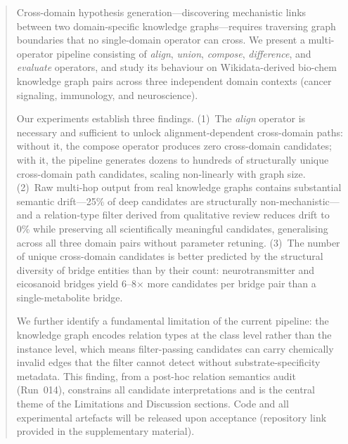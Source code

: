 \begin{abstract}
Cross-domain hypothesis generation---discovering mechanistic links between two
domain-specific knowledge graphs---requires traversing graph boundaries that no
single-domain operator can cross.
We present a multi-operator pipeline consisting of \textit{align}, \textit{union},
\textit{compose}, \textit{difference}, and \textit{evaluate} operators, and study its
behaviour on Wikidata-derived bio-chem knowledge graph pairs across three independent
domain contexts (cancer signaling, immunology, and neuroscience).

Our experiments establish three findings.
(1)~The \textit{align} operator is necessary and sufficient to unlock
alignment-dependent cross-domain paths: without it, the compose operator produces
zero cross-domain candidates; with it, the pipeline generates dozens to hundreds of
structurally unique cross-domain path candidates, scaling non-linearly with graph size.
(2)~Raw multi-hop output from real knowledge graphs contains substantial semantic
drift---25\% of deep candidates are structurally non-mechanistic---and a relation-type
filter derived from qualitative review reduces drift to 0\% while preserving all
scientifically meaningful candidates, generalising across all three domain pairs
without parameter retuning.
(3)~The number of unique cross-domain candidates is better predicted by the structural
diversity of bridge entities than by their count: neurotransmitter and eicosanoid bridges
yield 6--8$\times$ more candidates per bridge pair than a single-metabolite bridge.

We further identify a fundamental limitation of the current pipeline: the knowledge
graph encodes relation types at the class level rather than the instance level,
which means filter-passing candidates can carry chemically invalid edges that the
filter cannot detect without substrate-specificity metadata.
This finding, from a post-hoc relation semantics audit (Run~014),
constrains all candidate interpretations and is the central theme of
the Limitations and Discussion sections.
Code and all experimental artefacts will be released upon acceptance
(repository link provided in the supplementary material).
\end{abstract}
